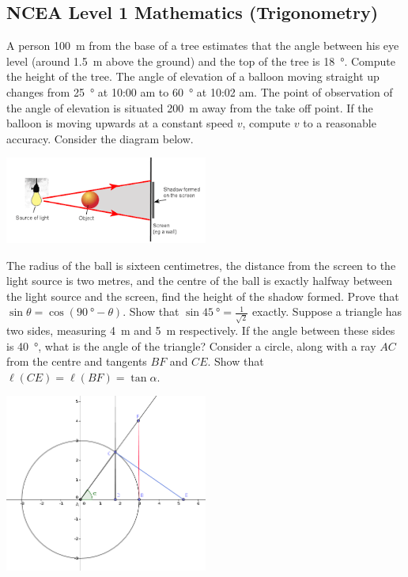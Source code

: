 \documentclass{exam}
\begin{document}
\begin{questions}

\section*{NCEA Level 1 Mathematics (Trigonometry)}

\question A person \SI{100}{\metre} from the base of a tree estimates that the angle  between his eye level (around \SI{1.5}{\metre} above
          the ground) and the top of the tree is \SI{18}{\degree}. Compute the height of the tree.
\question The angle of elevation of a balloon moving straight up changes from \SI{25}{\degree} at 10:00 am to \SI{60}{\degree} at 10:02 am. The point
          of observation of the angle of elevation is situated \SI{200}{\metre} away from the take off point. If the balloon is moving upwards at a
          constant speed $ v $, compute $ v $ to a reasonable accuracy.
\question Consider the diagram below.
          \begin{center}
            \includegraphics[width=0.5\textwidth]{shadow1}
          \end{center}
          The radius of the ball is sixteen centimetres, the distance from the screen to the light source is two metres, and
          the centre of the ball is exactly halfway between the light source and the screen, find the height of the shadow formed.
\question Prove that $ \sin \theta = \cos(\SI{90}{\degree} -  \theta) $.
\question Show that $ \sin \SI{45}{\degree} = \frac{1}{\sqrt{2}} $ exactly.
\question Suppose a triangle has two sides, measuring \SI{4}{\metre} and \SI{5}{\metre} respectively. If the angle between these sides
          is \SI{40}{\degree}, what is the angle of the triangle?
\question Consider a circle, along with a ray $ AC $ from the centre and tangents $ BF $ and $ CE $. Show that $ \ell(CE) = \ell(BF) = \tan \alpha $.
          \begin{center}
            \includegraphics[width=0.5\textwidth]{wowtrig}

\end{center}
\end{questions}
\end{document}
